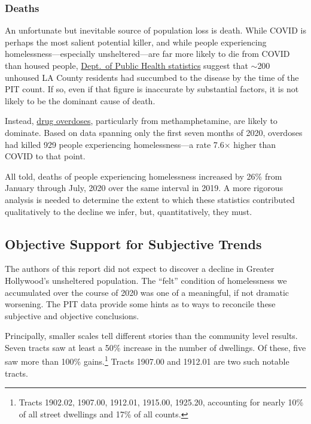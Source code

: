 \documentclass[11pt,twocolumn]{article}
\begin{document}
\subsubsection{Deaths}

An unfortunate but inevitable source of population loss is death. While COVID is perhaps the most salient potential killer,
and while people experiencing homelessness---especially unsheltered---are far more likely to die from COVID than housed
people, \href{http://publichealth.lacounty.gov/media/coronavirus/docs/SummaryReport_People_Experiencing_Homelessness.pdf}
{Dept.\ of Public Health statistics} suggest that $\sim$200 unhoused LA County residents had succumbed to the 
disease by the time of the PIT count. If so, even if that figure is inaccurate by substantial factors, it is not likely to be the
dominant cause of death.

Instead, \href{http://publichealth.lacounty.gov/chie/reports/HomelessMortality2020_CHIEBrief_Final.pdf}{drug overdoses},
particularly from methamphetamine, are likely to dominate. Based on data spanning only the first seven months of 2020, overdoses had
killed 929 people experiencing homelessness---a rate 7.6$\times$ higher than COVID to that point.

All told, deaths of people experiencing homelessness increased by 26\% from January through July, 2020 over the same
interval in 2019. A more rigorous analysis is needed to determine the extent to which these statistics contributed 
qualitatively to the decline we infer, but, quantitatively, they must.

\subsection{Objective Support for Subjective Trends}

The authors of this report did not expect to discover a decline in Greater Hollywood's unsheltered population.
The ``felt'' condition of homelessness we accumulated over the course of 2020 was one of a meaningful,
if not dramatic worsening. The PIT data provide some hints as to ways to reconcile these subjective and 
objective conclusions.

Principally, smaller scales tell different stories than the community level results. Seven tracts saw at least a 
50\% increase in the number of dwellings. Of these, five saw more than 100\% gains.\footnote{Tracts 1902.02, 
1907.00, 1912.01, 1915.00, 1925.20, accounting for nearly 10\% of all street dwellings and 17\% of all counts.} 
Tracts 1907.00 and 1912.01 are two such notable tracts.
\end{document}
